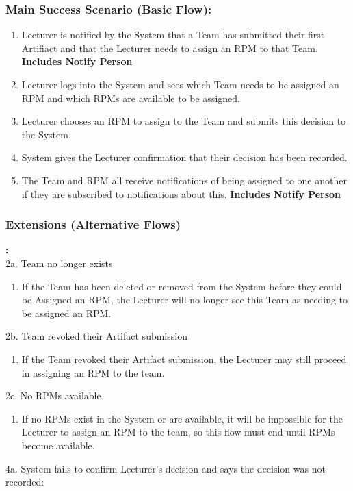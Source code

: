     \subsubsection*{Main Success Scenario (Basic Flow):}
    \begin{enumerate}
        \itemsep-1em 
        \item Lecturer is notified by the System that a Team has submitted their first Artifiact and that the Lecturer needs to assign an RPM to that Team. \textbf{Includes Notify Person}
        \item Lecturer logs into the System and sees which Team needs to be assigned an RPM and which RPMs are available to be assigned.
        \item Lecturer chooses an RPM to assign to the Team and submits this decision to the System.
         \item System gives the Lecturer confirmation that their decision has been recorded.
         \item The Team and RPM all receive notifications of being assigned to one another if they are subscribed to notifications about this. \textbf{Includes Notify Person}
    \end{enumerate}
    
    
    
    
     \subsubsection*{Extensions (Alternative Flows)}\textbf{:}
     \newline
     \\
     2a. Team no longer exists
     \begin{enumerate}
         \itemsep-1em 
        \item If the Team has been deleted or removed from the System before they could be Assigned an RPM, the Lecturer will no longer see this Team as needing to be assigned an RPM.
    \end{enumerate}
    2b. Team revoked their Artifact submission
\begin{enumerate}
        \itemsep-1em 
        \item If the Team revoked their Artifact submission, the Lecturer may still proceed in assigning an RPM to the team.
    \end{enumerate}
    
    2c. No RPMs available
    
    \begin{enumerate}
        \itemsep-1em 
        \item If no RPMs exist in the System or are available, it will be impossible for the Lecturer to assign an RPM to the team, so this flow must end until RPMs become available.
    \end{enumerate}
4a. System fails to confirm Lecturer’s decision and says the decision was not recorded:
    
